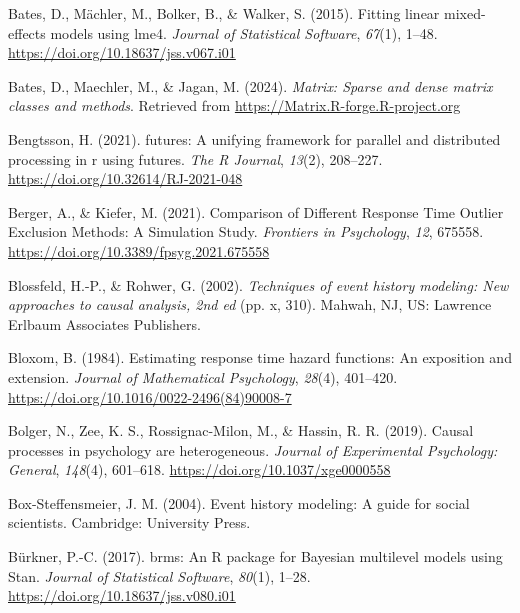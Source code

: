 \documentclass[
  man, donotrepeattitle,floatsintext]{apa6}
\newlength{\cslhangindent}
\newenvironment{CSLReferences}[2] %
 {\begin{list}{}{%
  \setlength{\itemindent}{0pt}
  \setlength{\leftmargin}{0pt}
  \setlength{\parsep}{0pt}
  \ifodd #1
   \setlength{\leftmargin}{\cslhangindent}
   \setlength{\itemindent}{-1\cslhangindent}
  \fi
  \setlength{\itemsep}{#2\baselineskip}}}
 {\end{list}}
\begin{document}
\begin{CSLReferences}{1}{0}
Bates, D., Mächler, M., Bolker, B., \& Walker, S. (2015). Fitting linear mixed-effects models using {lme4}. \emph{Journal of Statistical Software}, \emph{67}(1), 1--48. \url{https://doi.org/10.18637/jss.v067.i01}

Bates, D., Maechler, M., \& Jagan, M. (2024). \emph{Matrix: Sparse and dense matrix classes and methods}. Retrieved from \url{https://Matrix.R-forge.R-project.org}

Bengtsson, H. (2021). {futures}: A unifying framework for parallel and distributed processing in r using futures. \emph{The R Journal}, \emph{13}(2), 208--227. \url{https://doi.org/10.32614/RJ-2021-048}

Berger, A., \& Kiefer, M. (2021). Comparison of {Different Response Time Outlier Exclusion Methods}: {A Simulation Study}. \emph{Frontiers in Psychology}, \emph{12}, 675558. \url{https://doi.org/10.3389/fpsyg.2021.675558}

Blossfeld, H.-P., \& Rohwer, G. (2002). \emph{Techniques of event history modeling: {New} approaches to causal analysis, 2nd ed} (pp. x, 310). Mahwah, NJ, US: Lawrence Erlbaum Associates Publishers.

Bloxom, B. (1984). Estimating response time hazard functions: {An} exposition and extension. \emph{Journal of Mathematical Psychology}, \emph{28}(4), 401--420. \url{https://doi.org/10.1016/0022-2496(84)90008-7}

Bolger, N., Zee, K. S., Rossignac-Milon, M., \& Hassin, R. R. (2019). Causal processes in psychology are heterogeneous. \emph{Journal of Experimental Psychology: General}, \emph{148}(4), 601--618. \url{https://doi.org/10.1037/xge0000558}

Box-Steffensmeier, J. M. (2004). Event history modeling: A guide for social scientists. Cambridge: University Press.

Bürkner, P.-C. (2017). {brms}: An {R} package for {Bayesian} multilevel models using {Stan}. \emph{Journal of Statistical Software}, \emph{80}(1), 1--28. \url{https://doi.org/10.18637/jss.v080.i01}


\end{CSLReferences}
\end{document}
